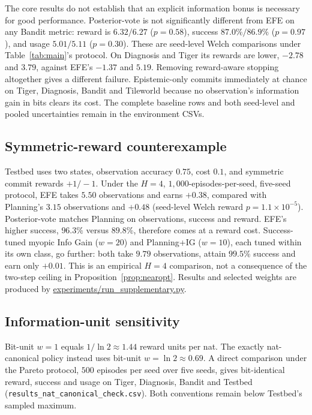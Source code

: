 \documentclass[runningheads]{llncs}
\begin{document}
The core results do not establish that an explicit information bonus is necessary for good performance. Posterior-vote is not significantly different from EFE on any Bandit metric: reward is $6.32/6.27$ ($p=0.58$), success $87.0\%/86.9\%$ ($p=0.97$), and usage $5.01/5.11$ ($p=0.30$). These are seed-level Welch comparisons under Table~\ref{tab:main}'s protocol. On Diagnosis and Tiger its rewards are lower, $-2.78$ and $3.79$, against EFE's $-1.37$ and $5.19$. Removing reward-aware stopping altogether gives a different failure. Epistemic-only commits immediately at chance on Tiger, Diagnosis, Bandit and Tileworld because no observation's information gain in bits clears its cost. The complete baseline rows and both seed-level and pooled uncertainties remain in the environment CSVs.

\subsection{Symmetric-reward counterexample}
\label{app:testbed}

Testbed uses two states, observation accuracy $0.75$, cost $0.1$, and symmetric commit rewards $+1/{-}1$. Under the $H=4$, $1{,}000$-episodes-per-seed, five-seed protocol, EFE takes $5.50$ observations and earns $+0.38$, compared with Planning's $3.15$ observations and $+0.48$ (seed-level Welch reward $p=1.1\times10^{-5}$). Posterior-vote matches Planning on observations, success and reward. EFE's higher success, $96.3\%$ versus $89.8\%$, therefore comes at a reward cost. Success-tuned myopic Info Gain ($w=20$) and Planning+IG ($w=10$), each tuned within its own class, go further: both take $9.79$ observations, attain $99.5\%$ success and earn only $+0.01$. This is an empirical $H=4$ comparison, not a consequence of the two-step ceiling in Proposition~\ref{prop:nearopt}. Results and selected weights are produced by \url{experiments/run_supplementary.py}.

\subsection{Information-unit sensitivity}
\label{app:nat_canonical}

Bit-unit $w=1$ equals $1/\ln2\approx1.44$ reward units per nat. The exactly nat-canonical policy instead uses bit-unit $w=\ln2\approx0.69$. A direct comparison under the Pareto protocol, $500$ episodes per seed over five seeds, gives bit-identical reward, success and usage on Tiger, Diagnosis, Bandit and Testbed (\texttt{results\_nat\_canonical\_check.csv}). Both conventions remain below Testbed's sampled maximum.
\end{document}
